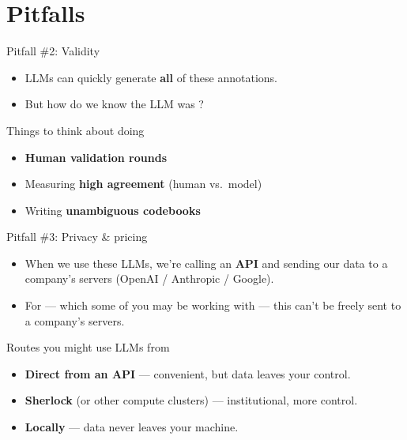 \documentclass[aspectratio=169,t]{beamer}
\begin{document}
\section{Pitfalls}
\roadmapframe

\begin{frame}{Pitfall \#2: Validity}
    \begin{itemize}
        \item LLMs can quickly generate \textbf{all} of these annotations.
        \item But how do we know the LLM was ?
    \end{itemize}
    \vspace{0.5em}
    \begin{block}{Things to think about doing}
        \begin{itemize}
            \item \textbf{Human validation rounds}
            \item Measuring \textbf{high agreement} (human vs.\ model)
            \item Writing \textbf{unambiguous codebooks}
        \end{itemize}
    \end{block}
\end{frame}

\begin{frame}{Pitfall \#3: Privacy \& pricing}
    \begin{itemize}
        \item When we use these LLMs, we're calling an \textbf{API} and sending
              our data to a company's servers (OpenAI / Anthropic / Google).
        \item For  --- which some of you may
              be working with --- this can't be freely sent to a company's
              servers.
    \end{itemize}
    \vspace{0.5em}
    \begin{block}{Routes you might use LLMs from}
        \begin{itemize}
            \item \textbf{Direct from an API} --- convenient, but data leaves
                  your control.
            \item \textbf{Sherlock} (or other compute clusters) ---
                  institutional, more control.
            \item \textbf{Locally} --- data never leaves your machine.
        \end{itemize}
    \end{block}
\end{frame}
\end{document}
